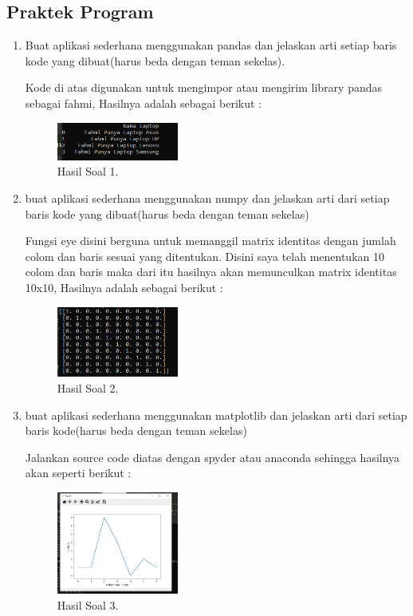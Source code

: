 \subsection{Praktek Program}
\begin{enumerate}
	\item Buat aplikasi sederhana menggunakan pandas dan jelaskan arti setiap baris kode yang dibuat(harus beda dengan teman sekelas).
	\hfill\break
	
	Kode di atas digunakan untuk mengimpor atau mengirim library pandas sebagai fahmi, Hasilnya adalah sebagai berikut :
	\begin{figure}[H]
	\centering
		\includegraphics[width=4cm]{figures/1174026/3/materi/hasilsoal1.PNG}
		\caption{Hasil Soal 1.}
	\end{figure}

	\item buat aplikasi sederhana menggunakan numpy dan jelaskan arti dari setiap baris kode yang dibuat(harus beda dengan teman sekelas)
	\hfill\break
	
	Fungsi eye disini berguna untuk memanggil matrix identitas dengan jumlah colom dan baris sesuai yang ditentukan. Disini saya telah menentukan 10 colom dan baris maka dari itu hasilnya akan memunculkan matrix identitas 10x10, Hasilnya adalah sebagai berikut :
	\begin{figure}[H]
	\centering
		\includegraphics[width=4cm]{figures/1174026/3/materi/hasilsoal2.PNG}
		\caption{Hasil Soal 2.}
	\end{figure}
	
	\item buat aplikasi sederhana menggunakan matplotlib dan jelaskan arti dari setiap baris kode(harus beda dengan teman sekelas)
	\hfill\break
	
	Jalankan source code diatas dengan spyder atau anaconda sehingga hasilnya akan seperti berikut : 

	\begin{figure}[H]
	\centering
		\includegraphics[width=4cm]{figures/1174026/3/materi/hasilsoal3.PNG}
		\caption{Hasil Soal 3.}
	\end{figure}


\end{enumerate}
